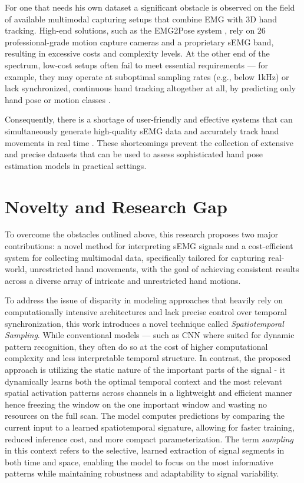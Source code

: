 For one that needs his own dataset a significant obstacle is observed on the field of available multimodal capturing setups that combine EMG with 3D hand tracking. High-end solutions, such as the EMG2Pose system \cite{salter2024emg2pose}, rely on 26 professional-grade motion capture cameras and a proprietary sEMG band, resulting in excessive costs and complexity levels. At the other end of the spectrum, low-cost setups often fail to meet essential requirements — for example, they may operate at suboptimal sampling rates (e.g., below 1kHz) or lack synchronized, continuous hand tracking altogether at all, by predicting only hand pose or motion classes \cite{nasri2020semg}.

Consequently, there is a shortage of user-friendly and effective systems that can simultaneously generate high-quality sEMG data and accurately track hand movements in real time \cite{graf2023combining}. These shortcomings prevent the collection of extensive and precise datasets that can be used to assess sophisticated hand pose estimation models in practical settings.

\section{Novelty and Research Gap}

To overcome the obstacles outlined above, this research proposes two major contributions: a novel method for interpreting sEMG signals and a cost-efficient system for collecting multimodal data, specifically tailored for capturing real-world, unrestricted hand movements, with the goal of achieving consistent results across a diverse array of intricate and unrestricted hand motions.

To address the issue of disparity in modeling approaches that heavily rely on computationally intensive architectures and lack precise control over temporal synchronization, this work introduces a novel technique called \textit{Spatiotemporal Sampling}. While conventional models — such as CNN where suited for dynamic pattern recognition, they often do so at the cost of higher computational complexity and less interpretable temporal structure. In contrast, the proposed approach is utilizing the static nature of the important parts of the signal - it dynamically learns both the optimal temporal context and the most relevant spatial activation patterns across channels in a lightweight and efficient manner hence freezing the window on the one important window and wasting no resources on the full scan. The model computes predictions by comparing the current input to a learned spatiotemporal signature, allowing for faster training, reduced inference cost, and more compact parameterization. The term \textit{sampling} in this context refers to the selective, learned extraction of signal segments in both time and space, enabling the model to focus on the most informative patterns while maintaining robustness and adaptability to signal variability.

